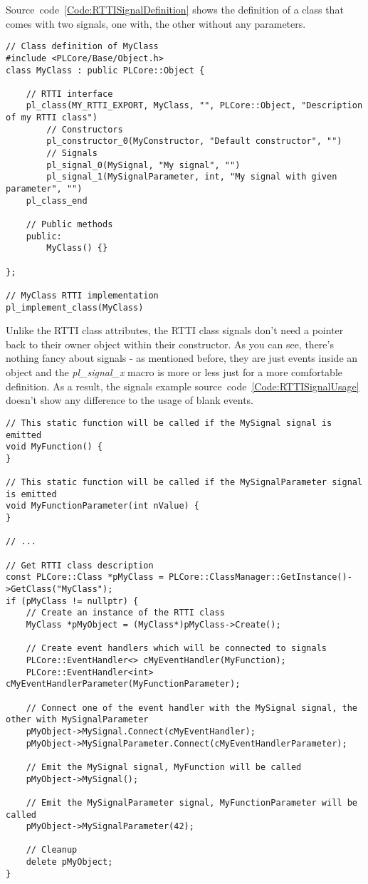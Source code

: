 Source~code~\ref{Code:RTTISignalDefinition} shows the definition of a class that comes with two signals, one with, the other without any parameters.
\begin{lstlisting}[label=Code:RTTISignalDefinition,caption={Defining a \ac{RTTI} class with signals}]
// Class definition of MyClass
#include <PLCore/Base/Object.h>
class MyClass : public PLCore::Object {

	// RTTI interface
	pl_class(MY_RTTI_EXPORT, MyClass, "", PLCore::Object, "Description of my RTTI class")
		// Constructors
		pl_constructor_0(MyConstructor, "Default constructor", "")
		// Signals
		pl_signal_0(MySignal, "My signal", "")
		pl_signal_1(MySignalParameter, int, "My signal with given parameter", "")
	pl_class_end

	// Public methods
	public:
		MyClass() {}

};

// MyClass RTTI implementation
pl_implement_class(MyClass)
\end{lstlisting}
Unlike the \ac{RTTI} class attributes, the \ac{RTTI} class signals don't need a pointer back to their owner object within their constructor. As you can see, there's nothing fancy about signals - as mentioned before, they are just events inside an object and the \emph{pl\_signal\_x} macro is more or less just for a more comfortable definition. As a result, the signals example source~code~\ref{Code:RTTISignalUsage} doesn't show any difference to the usage of blank events.
\begin{lstlisting}[label=Code:RTTISignalUsage,caption={Using signals of a \ac{RTTI} class}]
// This static function will be called if the MySignal signal is emitted
void MyFunction() {
}

// This static function will be called if the MySignalParameter signal is emitted
void MyFunctionParameter(int nValue) {
}

// ...

// Get RTTI class description
const PLCore::Class *pMyClass = PLCore::ClassManager::GetInstance()->GetClass("MyClass");
if (pMyClass != nullptr) {
	// Create an instance of the RTTI class
	MyClass *pMyObject = (MyClass*)pMyClass->Create();

	// Create event handlers which will be connected to signals
	PLCore::EventHandler<> cMyEventHandler(MyFunction);
	PLCore::EventHandler<int> cMyEventHandlerParameter(MyFunctionParameter);

	// Connect one of the event handler with the MySignal signal, the other with MySignalParameter
	pMyObject->MySignal.Connect(cMyEventHandler);
	pMyObject->MySignalParameter.Connect(cMyEventHandlerParameter);

	// Emit the MySignal signal, MyFunction will be called
	pMyObject->MySignal();

	// Emit the MySignalParameter signal, MyFunctionParameter will be called
	pMyObject->MySignalParameter(42);

	// Cleanup
	delete pMyObject;
}
\end{lstlisting}
